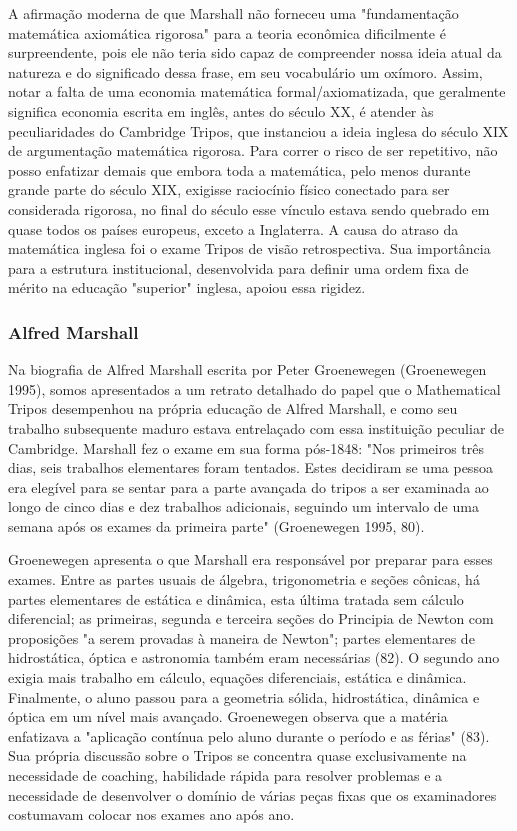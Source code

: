 \documentclass[12pt]{article}
\begin{document}
A afirmação moderna de que Marshall não forneceu uma "fundamentação matemática axiomática rigorosa" para a teoria econômica dificilmente é surpreendente, pois ele não teria sido capaz de compreender nossa ideia atual da natureza e do significado dessa frase, em seu vocabulário um oxímoro. Assim, notar a falta de uma economia matemática formal/axiomatizada, que geralmente significa economia escrita em inglês, antes do século XX, é atender às peculiaridades do Cambridge Tripos, que instanciou a ideia inglesa do século XIX de argumentação matemática rigorosa. Para correr o risco de ser repetitivo, não posso enfatizar demais que embora toda a matemática, pelo menos durante grande parte do século XIX, exigisse raciocínio físico conectado para ser considerada rigorosa, no final do século esse vínculo estava sendo quebrado em quase todos os países europeus, exceto a Inglaterra. A causa do atraso da matemática inglesa foi o exame Tripos de visão retrospectiva. Sua importância para a estrutura institucional, desenvolvida para definir uma ordem fixa de mérito na educação "superior" inglesa, apoiou essa rigidez.

\subsubsection{\textbf{Alfred Marshall}}
Na biografia de Alfred Marshall escrita por Peter Groenewegen (Groenewegen 1995), somos apresentados a um retrato detalhado do papel que o Mathematical Tripos desempenhou na própria educação de Alfred Marshall, e como seu trabalho subsequente maduro estava entrelaçado com essa instituição peculiar de Cambridge. Marshall fez o exame em sua forma pós-1848: "Nos primeiros três dias, seis trabalhos elementares foram tentados. Estes decidiram se uma pessoa era elegível para se sentar para a parte avançada do tripos a ser examinada ao longo de cinco dias e dez trabalhos adicionais, seguindo um intervalo de uma semana após os exames da primeira parte" (Groenewegen 1995, 80).

Groenewegen apresenta o que Marshall era responsável por preparar para esses exames. Entre as partes usuais de álgebra, trigonometria e seções cônicas, há partes elementares de estática e dinâmica, esta última tratada sem cálculo diferencial; as primeiras, segunda e terceira seções do Principia de Newton com proposições "a serem provadas à maneira de Newton"; partes elementares de hidrostática, óptica e astronomia também eram necessárias (82). O segundo ano exigia mais trabalho em cálculo, equações diferenciais, estática e dinâmica. Finalmente, o aluno passou para a geometria sólida, hidrostática, dinâmica e óptica em um nível mais avançado. Groenewegen observa que a matéria enfatizava a "aplicação contínua pelo aluno durante o período e as férias" (83). Sua própria discussão sobre o Tripos se concentra quase exclusivamente na necessidade de coaching, habilidade rápida para resolver problemas e a necessidade de desenvolver o domínio de várias peças fixas que os examinadores costumavam colocar nos exames ano após ano.
\end{document}
